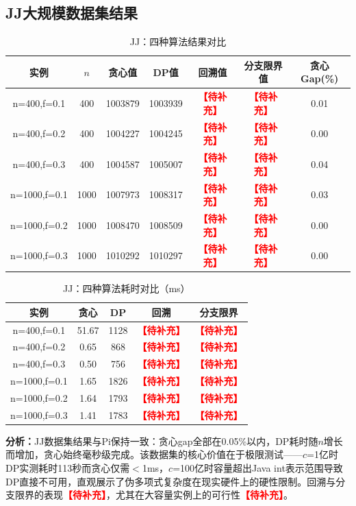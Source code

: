 \documentclass[6pt,a4paper]{ctexart}
\newcommand{\tb}{\textcolor{red}{\textbf{【待补充】}}}
\begin{document}
\subsection{JJ大规模数据集结果}

\begin{table}[ht]
\centering
\caption{JJ：四种算法结果对比}
\begin{tabular}{ccccccc}
\toprule
实例 & $n$ & 贪心值 & DP值 & 回溯值 & 分支限界值 & 贪心Gap(\%) \\
\midrule
n=400,f=0.1 & 400 & 1003879 & 1003939 & \tb & \tb & 0.01 \\
n=400,f=0.2 & 400 & 1004227 & 1004245 & \tb & \tb & 0.00 \\
n=400,f=0.3 & 400 & 1004587 & 1005007 & \tb & \tb & 0.04 \\
n=1000,f=0.1 & 1000 & 1007973 & 1008317 & \tb & \tb & 0.03 \\
n=1000,f=0.2 & 1000 & 1008470 & 1008509 & \tb & \tb & 0.00 \\
n=1000,f=0.3 & 1000 & 1010292 & 1010297 & \tb & \tb & 0.00 \\
\bottomrule
\end{tabular}
\end{table}

\begin{table}[ht]
\centering
\caption{JJ：四种算法耗时对比（ms）}
\begin{tabular}{ccccc}
\toprule
实例 & 贪心 & DP & 回溯 & 分支限界 \\
\midrule
n=400,f=0.1 & 51.67 & 1128 & \tb & \tb \\
n=400,f=0.2 & 0.65 & 868 & \tb & \tb \\
n=400,f=0.3 & 0.50 & 756 & \tb & \tb \\
n=1000,f=0.1 & 1.65 & 1826 & \tb & \tb \\
n=1000,f=0.2 & 1.64 & 1793 & \tb & \tb \\
n=1000,f=0.3 & 1.41 & 1783 & \tb & \tb \\
\bottomrule
\end{tabular}
\end{table}

\textbf{分析：}JJ数据集结果与Pi保持一致：贪心gap全部在0.05\%以内，DP耗时随$n$增长而增加，贪心始终毫秒级完成。该数据集的核心价值在于极限测试——$c$=1亿时DP实测耗时113秒而贪心仅需$<$1ms，$c$=100亿时容量超出Java int表示范围导致DP直接不可用，直观展示了伪多项式复杂度在现实硬件上的硬性限制。回溯与分支限界的表现\tb，尤其在大容量实例上的可行性\tb。

\end{document}
